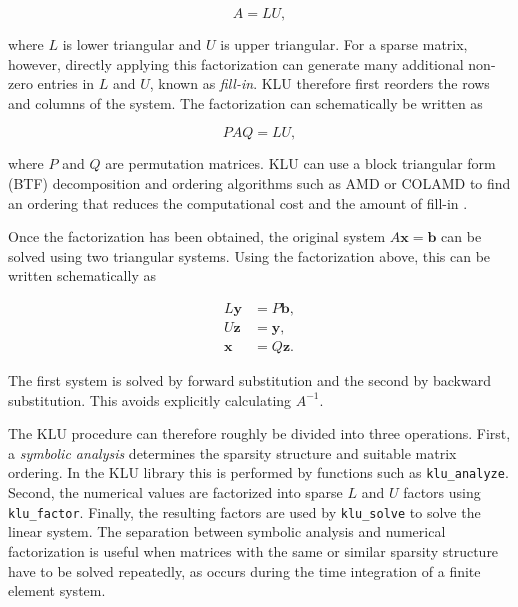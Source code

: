 \begin{equation}
A=LU,
\end{equation}

where $L$ is lower triangular and $U$ is upper triangular. For a sparse matrix, however, directly applying this factorization can generate many additional non-zero entries in $L$ and $U$, known as \emph{fill-in}. KLU therefore first reorders the rows and columns of the system. The factorization can schematically be written as

\begin{equation}
PAQ=LU,
\end{equation}

where $P$ and $Q$ are permutation matrices. KLU can use a block triangular form (BTF) decomposition and ordering algorithms such as AMD or COLAMD to find an ordering that reduces the computational cost and the amount of fill-in \cite{davis2010klu}.

Once the factorization has been obtained, the original system $A\mathbf{x}=\mathbf{b}$ can be solved using two triangular systems. Using the factorization above, this can be written schematically as

\begin{align}
L\mathbf{y} &= P\mathbf{b}, \\
U\mathbf{z} &= \mathbf{y}, \\
\mathbf{x} &= Q\mathbf{z}.
\end{align}

The first system is solved by forward substitution and the second by backward substitution. This avoids explicitly calculating $A^{-1}$.

The KLU procedure can therefore roughly be divided into three operations. First, a \emph{symbolic analysis} determines the sparsity structure and suitable matrix ordering. In the KLU library this is performed by functions such as \texttt{klu\_analyze}. Second, the numerical values are factorized into sparse $L$ and $U$ factors using \texttt{klu\_factor}. Finally, the resulting factors are used by \texttt{klu\_solve} to solve the linear system. The separation between symbolic analysis and numerical factorization is useful when matrices with the same or similar sparsity structure have to be solved repeatedly, as occurs during the time integration of a finite element system.
